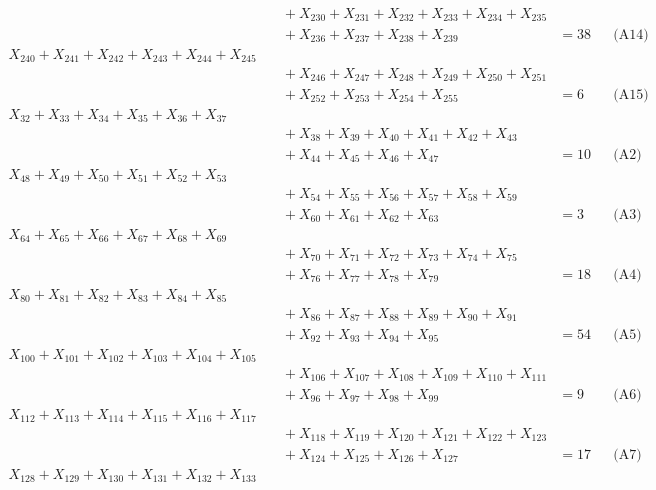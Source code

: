 \documentclass[a4paper,10pt]{article}
\begin{document}
{\begin{align}
&\quad  + X_{230} + X_{231} + X_{232} + X_{233} + X_{234} + X_{235} \\[0.5ex]
&\quad  + X_{236} + X_{237} + X_{238} + X_{239} &= 38 && \text{(A14)} \\
X_{240} + X_{241} + X_{242} + X_{243} + X_{244} + X_{245} \\[0.5ex]
&\quad  + X_{246} + X_{247} + X_{248} + X_{249} + X_{250} + X_{251} \\[0.5ex]
&\quad  + X_{252} + X_{253} + X_{254} + X_{255} &= 6 && \text{(A15)} \\
X_{32} + X_{33} + X_{34} + X_{35} + X_{36} + X_{37} \\[0.5ex]
&\quad  + X_{38} + X_{39} + X_{40} + X_{41} + X_{42} + X_{43} \\[0.5ex]
&\quad  + X_{44} + X_{45} + X_{46} + X_{47} &= 10 && \text{(A2)} \\
X_{48} + X_{49} + X_{50} + X_{51} + X_{52} + X_{53} \\[0.5ex]
&\quad  + X_{54} + X_{55} + X_{56} + X_{57} + X_{58} + X_{59} \\[0.5ex]
&\quad  + X_{60} + X_{61} + X_{62} + X_{63} &= 3 && \text{(A3)} \\
X_{64} + X_{65} + X_{66} + X_{67} + X_{68} + X_{69} \\[0.5ex]
&\quad  + X_{70} + X_{71} + X_{72} + X_{73} + X_{74} + X_{75} \\[0.5ex]
&\quad  + X_{76} + X_{77} + X_{78} + X_{79} &= 18 && \text{(A4)} \\
X_{80} + X_{81} + X_{82} + X_{83} + X_{84} + X_{85} \\[0.5ex]
&\quad  + X_{86} + X_{87} + X_{88} + X_{89} + X_{90} + X_{91} \\[0.5ex]
&\quad  + X_{92} + X_{93} + X_{94} + X_{95} &= 54 && \text{(A5)} \\
X_{100} + X_{101} + X_{102} + X_{103} + X_{104} + X_{105} \\[0.5ex]
&\quad  + X_{106} + X_{107} + X_{108} + X_{109} + X_{110} + X_{111} \\[0.5ex]
&\quad  + X_{96} + X_{97} + X_{98} + X_{99} &= 9 && \text{(A6)} \\
X_{112} + X_{113} + X_{114} + X_{115} + X_{116} + X_{117} \\[0.5ex]
&\quad  + X_{118} + X_{119} + X_{120} + X_{121} + X_{122} + X_{123} \\[0.5ex]
&\quad  + X_{124} + X_{125} + X_{126} + X_{127} &= 17 && \text{(A7)} \\
X_{128} + X_{129} + X_{130} + X_{131} + X_{132} + X_{133} \\[0.5ex]

\end{align}}
\end{document}
